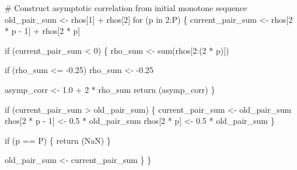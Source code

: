 \documentclass[
  letterpaper,
  DIV=11,
  numbers=noendperiod]{scrartcl}
\newenvironment{Shaded}{\begin{snugshade}}{\end{snugshade}}
\newcommand{\CommentTok}[1]{\textcolor[rgb]{0.37,0.37,0.37}{#1}}
\newcommand{\ConstantTok}[1]{\textcolor[rgb]{0.56,0.35,0.01}{#1}}
\newcommand{\ControlFlowTok}[1]{\textcolor[rgb]{0.00,0.23,0.31}{#1}}
\newcommand{\DecValTok}[1]{\textcolor[rgb]{0.68,0.00,0.00}{#1}}
\newcommand{\FloatTok}[1]{\textcolor[rgb]{0.68,0.00,0.00}{#1}}
\newcommand{\FunctionTok}[1]{\textcolor[rgb]{0.28,0.35,0.67}{#1}}
\newcommand{\NormalTok}[1]{\textcolor[rgb]{0.00,0.23,0.31}{#1}}
\newcommand{\OtherTok}[1]{\textcolor[rgb]{0.00,0.23,0.31}{#1}}
\newcommand{\SpecialCharTok}[1]{\textcolor[rgb]{0.37,0.37,0.37}{#1}}
\begin{document}
\begin{Shaded}
\begin{Highlighting}[]
  \CommentTok{\# Construct asymptotic correlation from initial monotone sequence}
\NormalTok{  old\_pair\_sum }\OtherTok{\textless{}{-}}\NormalTok{ rhos[}\DecValTok{1}\NormalTok{] }\SpecialCharTok{+}\NormalTok{ rhos[}\DecValTok{2}\NormalTok{]}
  \ControlFlowTok{for}\NormalTok{ (p }\ControlFlowTok{in} \DecValTok{2}\SpecialCharTok{:}\NormalTok{P) \{}
\NormalTok{    current\_pair\_sum }\OtherTok{\textless{}{-}}\NormalTok{ rhos[}\DecValTok{2} \SpecialCharTok{*}\NormalTok{ p }\SpecialCharTok{{-}} \DecValTok{1}\NormalTok{] }\SpecialCharTok{+}\NormalTok{ rhos[}\DecValTok{2} \SpecialCharTok{*}\NormalTok{ p]}
  
    \ControlFlowTok{if}\NormalTok{ (current\_pair\_sum }\SpecialCharTok{\textless{}} \DecValTok{0}\NormalTok{) \{}
\NormalTok{      rho\_sum }\OtherTok{\textless{}{-}} \FunctionTok{sum}\NormalTok{(rhos[}\DecValTok{2}\SpecialCharTok{:}\NormalTok{(}\DecValTok{2} \SpecialCharTok{*}\NormalTok{ p)])}
    
      \ControlFlowTok{if}\NormalTok{ (rho\_sum }\SpecialCharTok{\textless{}=} \SpecialCharTok{{-}}\FloatTok{0.25}\NormalTok{)}
\NormalTok{        rho\_sum }\OtherTok{\textless{}{-}} \SpecialCharTok{{-}}\FloatTok{0.25}
    
\NormalTok{      asymp\_corr }\OtherTok{\textless{}{-}} \FloatTok{1.0} \SpecialCharTok{+} \DecValTok{2} \SpecialCharTok{*}\NormalTok{ rho\_sum}
      \FunctionTok{return}\NormalTok{ (asymp\_corr)}
\NormalTok{    \}}
  
    \ControlFlowTok{if}\NormalTok{ (current\_pair\_sum }\SpecialCharTok{\textgreater{}}\NormalTok{ old\_pair\_sum) \{}
\NormalTok{      current\_pair\_sum }\OtherTok{\textless{}{-}}\NormalTok{ old\_pair\_sum}
\NormalTok{      rhos[}\DecValTok{2} \SpecialCharTok{*}\NormalTok{ p }\SpecialCharTok{{-}} \DecValTok{1}\NormalTok{] }\OtherTok{\textless{}{-}} \FloatTok{0.5} \SpecialCharTok{*}\NormalTok{ old\_pair\_sum}
\NormalTok{      rhos[}\DecValTok{2} \SpecialCharTok{*}\NormalTok{ p] }\OtherTok{\textless{}{-}} \FloatTok{0.5} \SpecialCharTok{*}\NormalTok{ old\_pair\_sum}
\NormalTok{    \}}
  
    \ControlFlowTok{if}\NormalTok{ (p }\SpecialCharTok{==}\NormalTok{ P) \{}
      \FunctionTok{return}\NormalTok{ (}\ConstantTok{NaN}\NormalTok{)}
\NormalTok{    \}}
  
\NormalTok{    old\_pair\_sum }\OtherTok{\textless{}{-}}\NormalTok{ current\_pair\_sum}
\NormalTok{  \}}
\NormalTok{\}}
\end{Highlighting}
\end{Shaded}
\end{document}
